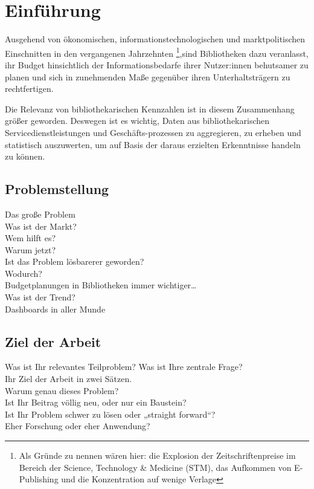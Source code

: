 \chapter{Einführung}


Ausgehend von ökonomischen, informationstechnologischen und marktpolitischen Einschnitten in den
vergangenen Jahrzehnten \footnote{Als Gründe zu nennen wären hier: die Explosion der Zeitschriftenpreise im Bereich der
Science, Technology \& Medicine (STM), das Aufkommen von E-Publishing und die Konzentration auf wenige
Verlage},sind Bibliotheken dazu veranlasst, ihr Budget hinsichtlich der Informationsbedarfe
ihrer Nutzer:innen behutsamer zu planen und sich in zunehmenden Maße gegenüber ihren Unterhaltsträgern zu rechtfertigen.

Die Relevanz von bibliothekarischen Kennzahlen ist in diesem Zusammenhang größer geworden.
Deswegen ist es wichtig, Daten aus bibliothekarischen Servicedienstleistungen und Geschäfts-prozessen zu aggregieren, zu erheben und statistisch
auszuwerten, um auf Basis der daraus erzielten Erkenntnisse handeln zu können.

\section{Problemstellung}

Das große Problem\\
Was ist der Markt?\\
Wem hilft es?\\
Warum jetzt?\\
Ist das Problem lösbarerer geworden?\\
Wodurch?\\
Budgetplanungen in Bibliotheken immer wichtiger…\\
Was ist der Trend?\\
Dashboards in aller Munde


\section{Ziel der Arbeit}

Was ist Ihr relevantes Teilproblem? Was ist Ihre zentrale Frage?\\
Ihr Ziel der Arbeit in zwei Sätzen.\\
Warum genau dieses Problem?\\
Ist Ihr Beitrag völlig neu, oder nur ein Baustein?\\
Ist Ihr Problem schwer zu lösen oder „straight forward“?\\
Eher Forschung oder eher Anwendung?\\

